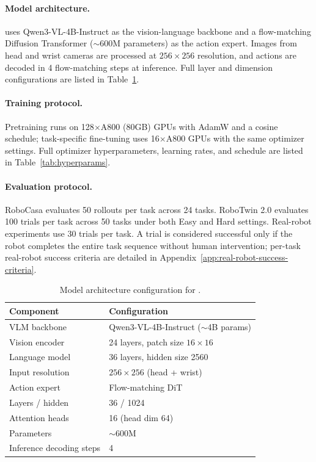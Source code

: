 \paragraph{Model architecture.}
\Ours uses Qwen3-VL-4B-Instruct as the vision-language backbone and a
flow-matching Diffusion Transformer ($\sim$600M parameters) as the action
expert. Images from head and wrist cameras are processed at $256{\times}256$
resolution, and actions are decoded in 4 flow-matching steps at inference.
Full layer and dimension configurations are listed in
Table~\ref{tab:architecture}.

\paragraph{Training protocol.}
Pretraining runs on 128$\times$A800 (80GB) GPUs with AdamW and a
cosine schedule; task-specific fine-tuning uses 16$\times$A800 GPUs with the
same optimizer settings. Full optimizer hyperparameters, learning rates, and
schedule are listed in Table~\ref{tab:hyperparams}.

\paragraph{Evaluation protocol.}
RoboCasa evaluates 50 rollouts per task across 24 tasks. RoboTwin 2.0
evaluates 100 trials per task across 50 tasks under both Easy and Hard
settings. Real-robot experiments use 30 trials per task.
A trial is considered successful only if the robot completes the entire task
sequence without human intervention; per-task real-robot success criteria are
detailed in Appendix~\ref{app:real-robot-success-criteria}.

\begin{table}[htbp]
\centering
\small
\caption{Model architecture configuration for \Ours.}
\label{tab:architecture}
\renewcommand{\arraystretch}{1.1}
\begin{tabular}{ll}
\toprule
\textbf{Component} & \textbf{Configuration} \\
\midrule
VLM backbone              & Qwen3-VL-4B-Instruct ($\sim$4B params) \\
\quad Vision encoder      & 24 layers, patch size $16{\times}16$ \\
\quad Language model      & 36 layers, hidden size 2560 \\
Input resolution          & $256{\times}256$ (head + wrist) \\
\midrule
Action expert             & Flow-matching DiT \\
\quad Layers / hidden     & 36 / 1024 \\
\quad Attention heads     & 16 (head dim 64) \\
\quad Parameters          & $\sim$600M \\
Inference decoding steps  & 4 \\
\bottomrule
\end{tabular}
\end{table}

